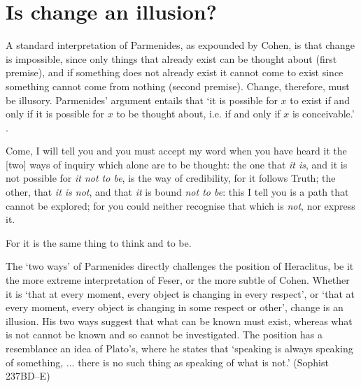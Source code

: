 \section{Is change an illusion?}



A standard interpretation of Parmenides, as expounded by Cohen, is that change is impossible, since only things that already exist can be thought about (first premise), and if something does not already exist it cannot come to exist since something cannot come from nothing (second premise). Change, therefore, must be illusory. Parmenides' argument entails that `it is possible for $x$ to exist if and only if it is possible for $x$ to be thought about, i.e. if and only if $x$ is conceivable.' \parencite[][]{cohen-parm1}.
\begin{quoting}
Come, I will tell you {\textemdash} and you must accept my word when you have heard it {\textemdash} the [two] ways of inquiry which alone are to be thought: the one that \emph{it is}, and it is not possible for \emph{it not to be}, is the way of credibility, for it follows Truth; the other, that \emph{it is not}, and that \emph{it} is bound \emph{not to be}: this I tell you is a path that cannot be explored; for you could neither recognise that which is \emph{not}, nor express it. \parencite[][43]{fitt1983ancilla}
\end{quoting}
\begin{quoting}
For it is the same thing to think and to be. \parencite[][43]{fitt1983ancilla}
\end{quoting}

The `two ways' of Parmenides directly challenges the position of Heraclitus, be it the more extreme interpretation of Feser, or the more subtle of Cohen. Whether it is `that at every moment, every object is changing in every respect', or `that at every moment, every object is changing in some respect or other', change is an illusion. His two ways suggest that what can be known must exist, whereas what is not cannot be known and so cannot be investigated. The position has a resemblance an idea of Plato's, where he states that `speaking is always speaking of something, {...} there is no such thing as speaking of what is not.' (Sophist 237BD--E)

